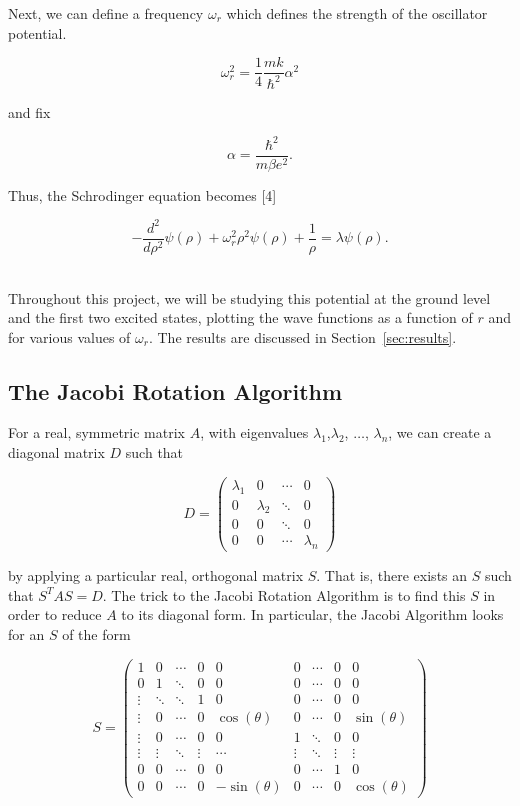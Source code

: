 \documentclass[12pt]{article}
\numberwithin{equation}{section}
\begin{document}
\noindent Next, we can define a frequency $\omega_{r}$ which defines the strength of the oscillator potential.

$$\omega_{r}^{2}=\frac{1}{4}\frac{mk}{\hbar^{2}}\alpha^{2}$$

\noindent and fix 

$$\alpha=\frac{\hbar^{2}}{m\beta e^{2}}.$$

\noindent Thus, the Schrodinger equation becomes [4]

$$-\frac{d^{2}}{d\rho^{2}}\psi\left(\rho\right)+\omega_{r}^{2}\rho^{2}\psi\left(\rho\right)+\frac{1}{\rho}=\lambda\psi\left(\rho\right).$$

\\\indent Throughout this project, we will be studying this potential at the ground level and the first two excited states, plotting the wave functions as a function of $r$ and for various values of $\omega_{r}$.  The results are discussed in Section~\ref{sec:results}.

\subsection{The Jacobi Rotation Algorithm}
\label{subsec:jacobi}
For a real, symmetric matrix $A$, with eigenvalues $\lambda_{1}$,$\lambda_{2}$, $\ldots$, $\lambda_{n}$, we can create a diagonal matrix $D$ such that

$$D=\left(\begin{array}{cccc}
\lambda_{1} & 0 & \cdots & 0 \\
0 & \lambda_{2} & \ddots & 0 \\
0 & 0 & \ddots & 0 \\
0 & 0 & \cdots & \lambda_{n}
\end{array}\right)$$

\noindent by applying a particular real, orthogonal matrix $S$.  That is, there exists an $S$ such that $S^{T}AS=D$.  The trick to the Jacobi Rotation Algorithm is to find this $S$ in order to reduce $A$ to its diagonal form.  In particular, the Jacobi Algorithm looks for an $S$ of the form

$$S = \left(\begin{array}{ccccccccc}
1 & 0 & \cdots & 0 & 0 & 0 & \cdots & 0 & 0 \\
0 & 1 & \ddots & 0 & 0 & 0 & \cdots & 0 & 0 \\
\vdots & \ddots & \ddots & 1 & 0 & 0 & \cdots & 0 & 0 \\
\vdots & 0 & \cdots & 0 & \cos(\theta) & 0 & \cdots & 0 & \sin(\theta) \\
\vdots & 0 & \cdots & 0 & 0 & 1 & \ddots & 0 & 0 \\
\vdots & \vdots & \ddots & \vdots & \cdots & \vdots & \ddots & \vdots & \vdots \\
0 & 0 & \cdots & 0 & 0 & 0 & \cdots & 1 & 0 \\
0 & 0 & \cdots & 0 & -\sin(\theta) & 0 & \cdots & 0 & \cos(\theta) 
\end{array}\right)$$
\end{document}
